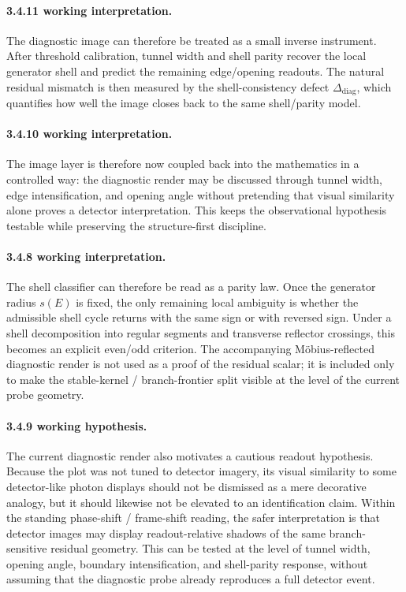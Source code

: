 \documentclass[12pt,a4paper]{article}
\begin{document}
\paragraph{3.4.11 working interpretation.}
The diagnostic image can therefore be treated as a small inverse instrument. After threshold calibration, tunnel width and shell parity recover the local generator shell and predict the remaining edge/opening readouts. The natural residual mismatch is then measured by the shell-consistency defect $\Delta_{\mathrm{diag}}$, which quantifies how well the image closes back to the same shell/parity model.

\paragraph{3.4.10 working interpretation.}
The image layer is therefore now coupled back into the mathematics in a controlled way: the diagnostic render may be discussed through tunnel width, edge intensification, and opening angle without pretending that visual similarity alone proves a detector interpretation. This keeps the observational hypothesis testable while preserving the structure-first discipline.

\paragraph{3.4.8 working interpretation.}
The shell classifier can therefore be read as a parity law. Once the generator radius $s(E)$ is fixed, the only remaining local ambiguity is whether the admissible shell cycle returns with the same sign or with reversed sign. Under a shell decomposition into regular segments and transverse reflector crossings, this becomes an explicit even/odd criterion. The accompanying M\"obius-reflected diagnostic render is not used as a proof of the residual scalar; it is included only to make the stable-kernel / branch-frontier split visible at the level of the current probe geometry.


\paragraph{3.4.9 working hypothesis.}
The current diagnostic render also motivates a cautious readout hypothesis. Because the plot was not tuned to detector imagery, its visual similarity to some detector-like photon displays should not be dismissed as a mere decorative analogy, but it should likewise not be elevated to an identification claim. Within the standing phase-shift / frame-shift reading, the safer interpretation is that detector images may display readout-relative shadows of the same branch-sensitive residual geometry. This can be tested at the level of tunnel width, opening angle, boundary intensification, and shell-parity response, without assuming that the diagnostic probe already reproduces a full detector event.
\end{document}
